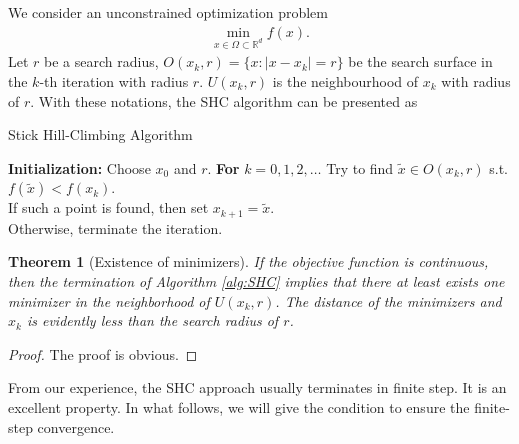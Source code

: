 \documentclass[preprint,12pt]{elsarticle}
\newtheorem{theorem}{Theorem}
\begin{document}
We consider an unconstrained optimization problem 
\begin{align}
	\min_{x\in\Omega\subset\mathbb{R}^d} f(x).
	\label{}
\end{align}
Let $r$ be a search radius, $O(x_k, r)=\{x:
|x-x_k|=r\}$ be the search surface in the
$k$-th iteration with radius $r$. $U(x_k,
r)$ is the neighbourhood of $x_k$ with radius of $r$.
With these notations, the SHC algorithm 
can be presented as 
\begin{algorithm}[H]
	\caption{Stick Hill-Climbing Algorithm}
	\label{alg:SHC}
\begin{algorithmic}[1]
	\STATE \textbf{Initialization:} Choose $x_0$ and $r$.
	\STATE \textbf{For} $k=0,1,2,\dots$
	\STATE \hspace{0.5cm} Try to find $\tilde{x}\in O(x_k, r)$
		   s.t. $f(\tilde x)<f(x_k)$.
			\\
		 \hspace{0.5cm} If such a point is found, then set
		 $x_{k+1}= \tilde{x}$.
		  \\
		   \hspace{0.5cm} Otherwise, terminate the iteration.
\end{algorithmic}
\end{algorithm}

\begin{theorem}[Existence of minimizers]
If the objective function is continuous, then the termination of 
Algorithm \ref{alg:SHC} implies that there at least exists one
minimizer in the neighborhood of $U(x_k,r)$. The distance of the
minimizers and $x_k$ is evidently less than the search radius of $r$.
	\label{}
\end{theorem}
\begin{proof}
	The proof is obvious.
\end{proof}

From our experience, the SHC approach usually terminates in 
finite step. It is an excellent property. In what follows, we will
give the condition to ensure the finite-step convergence.
\end{document}
